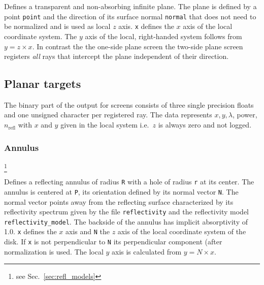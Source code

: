 \documentclass[10pt,a4paper,titlepage]{article}
\begin{document}




\vspace{0.25cm}
Defines a transparent and non-absorbing infinite plane. The plane is defined by a point {\tt point} and the direction of its surface normal {\tt normal} that does not need to be normalized and is used as local $z$ axis. {\tt x} defines the $x$ axis of the local coordinate system. The $y$ axis of the local, right-handed system follows from $y=z \times x$. In contrast the the one-side plane screen the two-side plane screen registers \emph{all} rays that intercept the plane independent of their direction.


\subsection{Planar targets}

The binary part of the output for screens consists of three single precision floats and one unsigned character per registered ray. The data represents $x, y, \lambda$, power, $n_{\mathrm{refl}}$ with $x$ and $y$ given in the local system i.e.\ $z$ is always zero and not logged.


\subsubsection{Annulus}









\footnote{see Sec.~\ref{sec:refl_models}}

\vspace{0.25cm}
Defines a reflecting annulus of radius {\tt R} with a hole of radius {\tt r} at its center. The annulus is centered at {\tt P}, its orientation defined by its normal vector {\tt N}. The normal vector points away from the reflecting surface characterized by its reflectivity spectrum given by the file {\tt reflectivity} and the reflectivity model {\tt reflectivity\_model}. The backside of the annulus has implicit absorptivity of 1.0. {\tt x} defines the $x$ axis and {\tt N} the $z$ axis of the local coordinate system of the disk. If {\tt x} is not perpendicular to {\tt N} its perpendicular component (after normalization is used. The local $y$ axis is calculated from $y = N \times x$.
\end{document}
